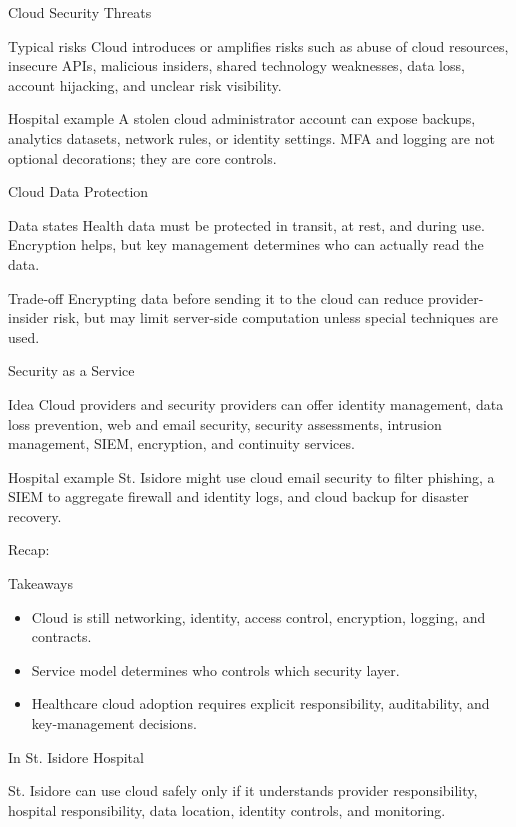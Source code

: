\documentclass[presentation]{beamer}
\newcommand{\scenario}{St. Isidore Hospital}
\newcommand{\takeawaysframe}[2]{
\begin{frame}[c]{Recap: \insertsection}
\begin{block}{Takeaways}
#1
\end{block}
\begin{exampleblock}{In \scenario}
#2
\end{exampleblock}
\end{frame}
}
\begin{document}
\begin{frame}[c]{Cloud Security Threats}
\begin{block}{Typical risks}
Cloud introduces or amplifies risks such as abuse of cloud resources, insecure APIs, malicious
insiders, shared technology weaknesses, data loss, account hijacking, and unclear risk visibility.
\end{block}

\begin{exampleblock}{Hospital example}
A stolen cloud administrator account can expose backups, analytics datasets, network rules, or
identity settings. MFA and logging are not optional decorations; they are core controls.
\end{exampleblock}
\end{frame}

\begin{frame}[c]{Cloud Data Protection}
\begin{block}{Data states}
Health data must be protected in transit, at rest, and during use. Encryption helps, but key
management determines who can actually read the data.
\end{block}

\begin{block}{Trade-off}
Encrypting data before sending it to the cloud can reduce provider-insider risk, but may limit
server-side computation unless special techniques are used.
\end{block}
\end{frame}

\begin{frame}[c]{Security as a Service}
\begin{block}{Idea}
Cloud providers and security providers can offer identity management, data loss prevention, web and
email security, security assessments, intrusion management, SIEM, encryption, and continuity
services.
\end{block}

\begin{exampleblock}{Hospital example}
St. Isidore might use cloud email security to filter phishing, a SIEM to aggregate firewall and
identity logs, and cloud backup for disaster recovery.
\end{exampleblock}
\end{frame}

\takeawaysframe{
\begin{itemize}
    \item Cloud is still networking, identity, access control, encryption, logging, and contracts.
    \item Service model determines who controls which security layer.
    \item Healthcare cloud adoption requires explicit responsibility, auditability, and key-management decisions.
\end{itemize}
}{
St. Isidore can use cloud safely only if it understands provider responsibility, hospital
responsibility, data location, identity controls, and monitoring.
}
\end{document}
